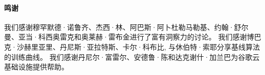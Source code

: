 \paragraph{鸣谢}
我们感谢穆罕默德·诺鲁齐、杰西·林、阿巴斯·阿卜杜勒马勒基、约翰·舒尔曼、亚当·科西奥雷克和奥莱赫·雷布金进行了富有洞察力的讨论。
我们感谢博巴克·沙赫里亚里、丹尼斯·亚拉特斯、卡尔·科布比,
与休伯特·索耶分享基线算法的训练曲线。 我们感谢丹尼尔·富雷尔、安德鲁·陈和达克谢什·加兰巴为谷歌云基础设施提供帮助。
